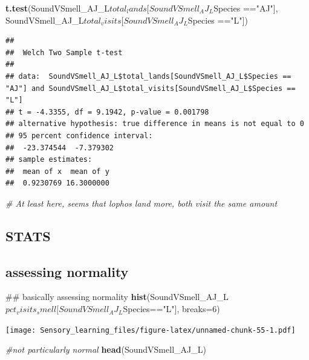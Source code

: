 \documentclass[]{article}
\newenvironment{Shaded}{\begin{snugshade}}{\end{snugshade}}
\newcommand{\KeywordTok}[1]{\textcolor[rgb]{0.13,0.29,0.53}{\textbf{{#1}}}}
\newcommand{\DataTypeTok}[1]{\textcolor[rgb]{0.13,0.29,0.53}{{#1}}}
\newcommand{\DecValTok}[1]{\textcolor[rgb]{0.00,0.00,0.81}{{#1}}}
\newcommand{\StringTok}[1]{\textcolor[rgb]{0.31,0.60,0.02}{{#1}}}
\newcommand{\CommentTok}[1]{\textcolor[rgb]{0.56,0.35,0.01}{\textit{{#1}}}}
\newcommand{\NormalTok}[1]{{#1}}
\begin{document}
\begin{Shaded}
\begin{Highlighting}[]
\KeywordTok{t.test}\NormalTok{(SoundVSmell_AJ_L$total_lands[SoundVSmell_AJ_L$Species ==}\StringTok{"AJ"}\NormalTok{], SoundVSmell_AJ_L$total_visits[SoundVSmell_AJ_L$Species ==}\StringTok{"L"}\NormalTok{])}
\end{Highlighting}
\end{Shaded}

\begin{verbatim}
## 
##  Welch Two Sample t-test
## 
## data:  SoundVSmell_AJ_L$total_lands[SoundVSmell_AJ_L$Species == "AJ"] and SoundVSmell_AJ_L$total_visits[SoundVSmell_AJ_L$Species == "L"]
## t = -4.3355, df = 9.1942, p-value = 0.001798
## alternative hypothesis: true difference in means is not equal to 0
## 95 percent confidence interval:
##  -23.374544  -7.379302
## sample estimates:
##  mean of x  mean of y 
##  0.9230769 16.3000000
\end{verbatim}

\begin{Shaded}
\begin{Highlighting}[]
\CommentTok{# At least here, seems that lophos land more, both visit the same amount}
\end{Highlighting}
\end{Shaded}

\subsection{STATS}\label{stats-2}

\subsection{assessing normality}\label{assessing-normality-2}

\begin{Shaded}
\begin{Highlighting}[]
\NormalTok{## basically assessing normality}
\KeywordTok{hist}\NormalTok{(SoundVSmell_AJ_L$pct_visits_smell[SoundVSmell_AJ_L$Species==}\StringTok{"L"}\NormalTok{], }\DataTypeTok{breaks=}\DecValTok{6}\NormalTok{)}
\end{Highlighting}
\end{Shaded}

\texttt{[image: Sensory\_learning\_files/figure-latex/unnamed-chunk-55-1.pdf]}

\begin{Shaded}
\begin{Highlighting}[]
\CommentTok{#not particularly normal}
\KeywordTok{head}\NormalTok{(SoundVSmell_AJ_L)}
\end{Highlighting}
\end{Shaded}
\end{document}
